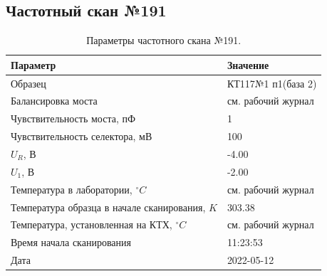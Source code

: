 \subsection{Частотный скан №191}
\begin{table}[!ht]
    \centering
    \caption{Параметры частотного скана №191.}
    \begin{tabular}{|l|l|}
        \hline
        Параметр                                       & Значение                  \\ \hline
        Образец                                        & КТ117№1 п1(база 2)        \\ \hline
        Балансировка моста                             & см. рабочий журнал        \\ \hline
        Чувствительность моста, пФ                     & 1                         \\ \hline
        Чувствительность селектора, мВ                 & 100                       \\ \hline
        $U_R$, В                                       & -4.00                     \\ \hline
        $U_1$, В                                       & -2.00                     \\ \hline
        Температура в лаборатории, $^\circ C$          & см. рабочий журнал        \\ \hline
        Температура образца в начале сканирования, $K$ & 303.38                    \\ \hline
        Температура, установленная на КТХ, $^\circ C$  & см. рабочий журнал        \\ \hline
        Время начала сканирования                      & 11:23:53                  \\ \hline
        Дата                                           & 2022-05-12                \\ \hline
    \end{tabular}
    \label{table:frequency_scan_191}
\end{table}

